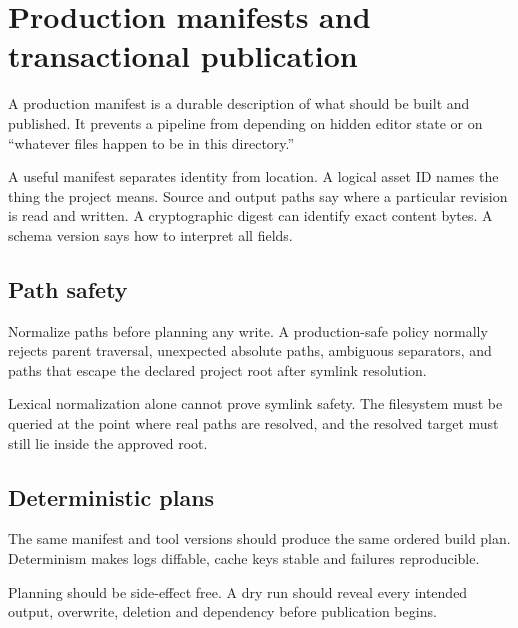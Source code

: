 \hypertarget{appendix-91eaa3cbdbc3}{}\label{referencestart:appendix-91eaa3cbdbc3}
\section{Production manifests and transactional publication}\label{appendix-91eaa3cbdbc3-production-manifests-and-transactional-publication}

\hypertarget{appendix-91eaa3cbdbc3-production-manifests-and-transactional-publication}{}

A production manifest is a durable description of what should be built and published. It prevents a pipeline from depending on hidden editor state or on ``whatever files happen to be in this directory.''

A useful manifest separates identity from location. A logical asset ID names the thing the project means. Source and output paths say where a particular revision is read and written. A cryptographic digest can identify exact content bytes. A schema version says how to interpret all fields.

\subsection{Path safety}\label{appendix-91eaa3cbdbc3-path-safety}

\hypertarget{appendix-91eaa3cbdbc3-path-safety}{}

Normalize paths before planning any write. A production-safe policy normally rejects parent traversal, unexpected absolute paths, ambiguous separators, and paths that escape the declared project root after symlink resolution.

Lexical normalization alone cannot prove symlink safety. The filesystem must be queried at the point where real paths are resolved, and the resolved target must still lie inside the approved root.

\subsection{Deterministic plans}\label{appendix-91eaa3cbdbc3-deterministic-plans}

\hypertarget{appendix-91eaa3cbdbc3-deterministic-plans}{}

The same manifest and tool versions should produce the same ordered build plan. Determinism makes logs diffable, cache keys stable and failures reproducible.

Planning should be side-effect free. A dry run should reveal every intended output, overwrite, deletion and dependency before publication begins.

